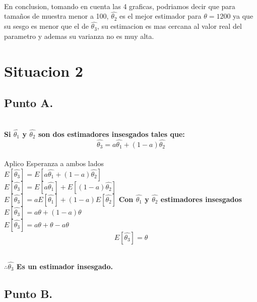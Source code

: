 \documentclass[letterpaper,12pt,onecolumn,titlepage]{article}
\begin{document}
~\\ En conclusion, tomando en cuenta las 4 graficas, podriamos decir que para tama\~{n}os de muestra menor a 100, $\hat{\theta_2}$ es el mejor estimador para $\theta=1200$ ya que su sesgo es menor que el de $\hat{\theta_3}$, su estimacion es mas cercana al valor real del parametro y ademas su varianza no es muy alta. 


\pagebreak \section{Situacion 2}
\subsection{Punto A.}
~\\\textbf{Si $\hat{\theta_1}$ y $\hat{\theta_2}$ son dos estimadores insesgados tales que:
~\\$$\hat{\theta_3}=a{\hat{\theta_1}}+(1-a){\hat{\theta_2}}$$}
~\\ Aplico Esperanza a ambos lados 
~\\ $E[\hat{\theta_3}] = E[a{\hat{\theta_1}}+(1-a){\hat{\theta_2}}]$
~\\ $E[\hat{\theta_3}] = E[a{\hat{\theta_1}}]+E[(1-a){\hat{\theta_2}}]$
~\\ $E[\hat{\theta_3}] = aE[{\hat{\theta_1}}]+(1-a)E[{\hat{\theta_2}}]$ \textbf{Con $\hat{\theta_1}$ y $\hat{\theta_2}$ estimadores insesgados}\
~\\ $E[\hat{\theta_3}] = a{\theta} + (1-a){\theta}$
~\\ $E[\hat{\theta_3}] = a{\theta} + {\theta} - a{\theta}$
~\\ $$E[\hat{\theta_3}]={\theta}$$

~\\\textbf{$\therefore \hat{\theta_3}$ Es un estimador insesgado.} 
 


\subsection{Punto B.} 
\end{document}
